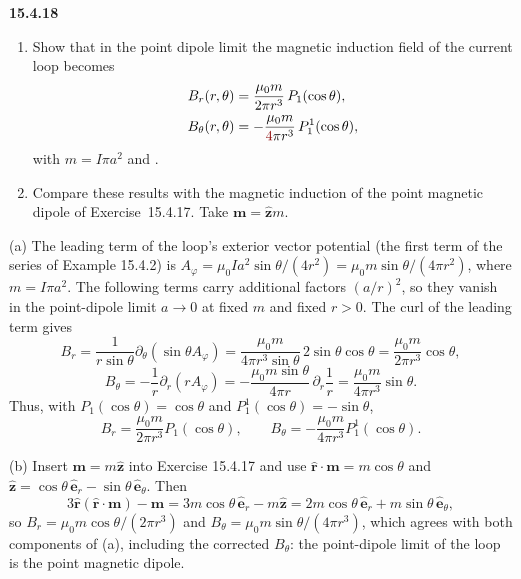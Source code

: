 \par\bigskip
\noindent\textbf{15.4.18}
\begin{enumerate}
\item[(a)] Show that in the point dipole limit the magnetic induction
field of the current loop becomes
\begin{align*}
B_{r}(r,\theta)&=\frac{\mu_{0}m}{2\pi r^{3}}\,P_{1}(\cos\theta),\\
B_{\theta}(r,\theta)&=-\frac{\mu_{0}m}{\erratum{4}\pi r^{3}}\,P_{1}^{1}(\cos\theta),
\end{align*}
with $m=I\pi a^{2}$ and .
\item[(b)] Compare these results with the magnetic induction of the
point magnetic dipole of Exercise~15.4.17. Take
$\mathbf{m}=\hat{\mathbf{z}}m$.
\end{enumerate}
\solution
(a) The leading term of the loop's exterior vector potential (the
first term of the series of Example 15.4.2) is
$A_\varphi=\mu_0Ia^2\sin\theta/(4r^2)
=\mu_0m\sin\theta/(4\pi r^2)$, where $m=I\pi a^2$. The following
terms carry additional factors $(a/r)^2$, so they vanish in the
point-dipole limit $a\to0$ at fixed $m$ and fixed $r>0$.
The curl of the leading term gives
\[
B_r=\frac1{r\sin\theta}\partial_\theta(\sin\theta A_\varphi)
=\frac{\mu_0m}{4\pi r^3\sin\theta}\,2\sin\theta\cos\theta
=\frac{\mu_0m}{2\pi r^3}\cos\theta,
\]
\[
B_\theta=-\frac1r\partial_r(rA_\varphi)
=-\frac{\mu_0m\sin\theta}{4\pi r}\,\partial_r\frac1r
=\frac{\mu_0m}{4\pi r^3}\sin\theta.
\]
Thus, with $P_1(\cos\theta)=\cos\theta$ and
$P_1^1(\cos\theta)=-\sin\theta$,
\[
\boxed{B_r=\frac{\mu_0m}{2\pi r^3}P_1(\cos\theta),\qquad
B_\theta=-\frac{\mu_0m}{4\pi r^3}P_1^1(\cos\theta)}.
\]

(b) Insert $\mathbf m=m\hat{\mathbf z}$ into Exercise 15.4.17
and use $\hat{\mathbf r}\cdot\mathbf m=m\cos\theta$ and
$\hat{\mathbf z}=\cos\theta\,\hat{\mathbf e}_r
-\sin\theta\,\hat{\mathbf e}_\theta$. Then
\[
3\hat{\mathbf r}(\hat{\mathbf r}\cdot\mathbf m)-\mathbf m
=3m\cos\theta\,\hat{\mathbf e}_r-m\hat{\mathbf z}
=2m\cos\theta\,\hat{\mathbf e}_r
+m\sin\theta\,\hat{\mathbf e}_\theta,
\]
so $B_r=\mu_0m\cos\theta/(2\pi r^3)$ and
$B_\theta=\mu_0m\sin\theta/(4\pi r^3)$, which agrees with both
components of (a), including the corrected $B_\theta$: the point-dipole
limit of the loop is the point magnetic dipole.

